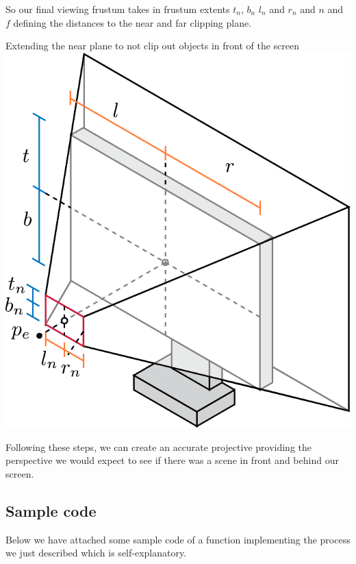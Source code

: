 So our final viewing frustum takes in frustum extents $t_n$, $b_n$ $l_n$ and $r_n$ and $n$ and $f$ defining the distances to the near and far clipping plane.
\begin{figureBox}[label={fig:extending-near}, width=0.8\linewidth]{Extending the near plane to not clip out objects in front of the screen}
    \centering
    \includegraphics[width = 0.5\linewidth]{./background/figures/projection/extending-near.pdf}
\end{figureBox}

Following these steps, we can create an accurate projective providing the perspective we would expect to see if there was a scene in front and behind our screen. 

\subsection{Sample code}
Below we have attached some sample code of a function implementing the process we just described which is self-explanatory.

